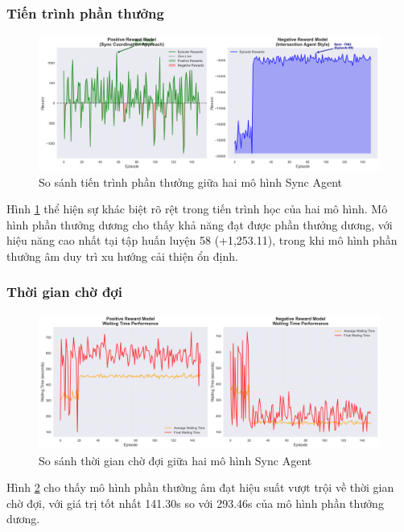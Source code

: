 \subsubsection{Tiến trình phần thưởng}

\begin{figure}[!htp]
    \centering
    \includegraphics[width=\textwidth]{figures/sync_reward_comparison.png}
    \caption{So sánh tiến trình phần thưởng giữa hai mô hình Sync Agent}
    \label{fig:sync_reward_comparison}
\end{figure}

Hình \ref{fig:sync_reward_comparison} thể hiện sự khác biệt rõ rệt trong tiến trình học của hai mô hình. Mô hình phần thưởng dương cho thấy khả năng đạt được phần thưởng dương, với hiệu năng cao nhất tại tập huấn luyện 58 (+1,253.11), trong khi mô hình phần thưởng âm duy trì xu hướng cải thiện ổn định.

\subsubsection{Thời gian chờ đợi}

\begin{figure}[!htp]
    \centering
    \includegraphics[width=\textwidth]{figures/sync_waiting_time_comparison.png}
    \caption{So sánh thời gian chờ đợi giữa hai mô hình Sync Agent}
    \label{fig:sync_waiting_time_comparison}
\end{figure}

Hình \ref{fig:sync_waiting_time_comparison} cho thấy mô hình phần thưởng âm đạt hiệu suất vượt trội về thời gian chờ đợi, với giá trị tốt nhất 141.30s so với 293.46s của mô hình phần thưởng dương.

